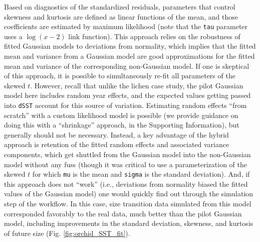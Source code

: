 \documentclass[12pt]{article}
\begin{document}
Based on diagnostics of the standardized residuals, parameters that control skewness and kurtosis are defined as linear functions of the mean, and those coefficients are estimated by maximum likelihood (note that the \verb|tau| parameter uses a $\log(x-2)$ link function). 
This approach relies on the robustness of fitted Gaussian models to deviations from normality, which implies that the fitted mean and variance from a Gaussian model are good approximations for the fitted mean and variance of the corresponding non-Gaussian model. 
If one is skeptical of this approach, it is possible to simultaneously re-fit all parameters of the skewed $t$. 
However, recall that unlike the lichen case study, the pilot Gaussian model here includes random year effects, and the expected values getting passed into \verb|dSST| account for this source of variation. 
Estimating random effects ``from scratch'' with a custom likelihood model is possible (we provide guidance on doing this with a ``shrinkage'' approach, in the Supporting Information), but generally should not be necessary. 
Instead, a key advantage of the hybrid approach is retention of the fitted random effects and associated variance components, which get shuttled from the Gaussian model into the non-Gaussian model without any fuss (though it was critical to use a parameterization of the skewed $t$ for which \verb|mu| is the mean and \verb|sigma| is the standard deviation). 
And, if this approach does not ``work'' (i.e., deviations from normality biased the fitted values of the Gaussian model) one would quickly find out through the simulation step of the workflow.
In this case, size transition data simulated from this model corresponded favorably to the real data, much better than the pilot Gaussian model, including improvements in the standard deviation, skewness, and kurtosis of future size (Fig. \ref{fig:orchid_SST_fit}). 
\end{document}
